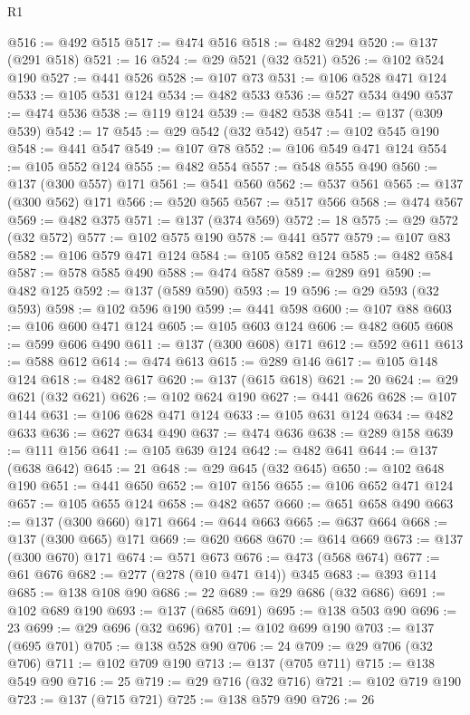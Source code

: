 \begin{lexlean}{R1}
\begin{coremodule}
@516 := @492 @515
@517 := @474 @516
@518 := @482 @294
@520 := @137 (@291 @518)
@521 := 16
@524 := @29 @521 (@32 @521)
@526 := @102 @524 @190
@527 := @441 @526
@528 := @107 @73
@531 := @106 @528 @471 @124
@533 := @105 @531 @124
@534 := @482 @533
@536 := @527 @534 @490
@537 := @474 @536
@538 := @119 @124
@539 := @482 @538
@541 := @137 (@309 @539)
@542 := 17
@545 := @29 @542 (@32 @542)
@547 := @102 @545 @190
@548 := @441 @547
@549 := @107 @78
@552 := @106 @549 @471 @124
@554 := @105 @552 @124
@555 := @482 @554
@557 := @548 @555 @490
@560 := @137 (@300 @557) @171
@561 := @541 @560
@562 := @537 @561
@565 := @137 (@300 @562) @171
@566 := @520 @565
@567 := @517 @566
@568 := @474 @567
@569 := @482 @375
@571 := @137 (@374 @569)
@572 := 18
@575 := @29 @572 (@32 @572)
@577 := @102 @575 @190
@578 := @441 @577
@579 := @107 @83
@582 := @106 @579 @471 @124
@584 := @105 @582 @124
@585 := @482 @584
@587 := @578 @585 @490
@588 := @474 @587
@589 := @289 @91
@590 := @482 @125
@592 := @137 (@589 @590)
@593 := 19
@596 := @29 @593 (@32 @593)
@598 := @102 @596 @190
@599 := @441 @598
@600 := @107 @88
@603 := @106 @600 @471 @124
@605 := @105 @603 @124
@606 := @482 @605
@608 := @599 @606 @490
@611 := @137 (@300 @608) @171
@612 := @592 @611
@613 := @588 @612
@614 := @474 @613
@615 := @289 @146
@617 := @105 @148 @124
@618 := @482 @617
@620 := @137 (@615 @618)
@621 := 20
@624 := @29 @621 (@32 @621)
@626 := @102 @624 @190
@627 := @441 @626
@628 := @107 @144
@631 := @106 @628 @471 @124
@633 := @105 @631 @124
@634 := @482 @633
@636 := @627 @634 @490
@637 := @474 @636
@638 := @289 @158
@639 := @111 @156
@641 := @105 @639 @124
@642 := @482 @641
@644 := @137 (@638 @642)
@645 := 21
@648 := @29 @645 (@32 @645)
@650 := @102 @648 @190
@651 := @441 @650
@652 := @107 @156
@655 := @106 @652 @471 @124
@657 := @105 @655 @124
@658 := @482 @657
@660 := @651 @658 @490
@663 := @137 (@300 @660) @171
@664 := @644 @663
@665 := @637 @664
@668 := @137 (@300 @665) @171
@669 := @620 @668
@670 := @614 @669
@673 := @137 (@300 @670) @171
@674 := @571 @673
@676 := @473 (@568 @674)
@677 := @61 @676
@682 := @277 (@278 (@10 @471 @14)) @345
@683 := @393 @114
@685 := @138 @108 @90
@686 := 22
@689 := @29 @686 (@32 @686)
@691 := @102 @689 @190
@693 := @137 (@685 @691)
@695 := @138 @503 @90
@696 := 23
@699 := @29 @696 (@32 @696)
@701 := @102 @699 @190
@703 := @137 (@695 @701)
@705 := @138 @528 @90
@706 := 24
@709 := @29 @706 (@32 @706)
@711 := @102 @709 @190
@713 := @137 (@705 @711)
@715 := @138 @549 @90
@716 := 25
@719 := @29 @716 (@32 @716)
@721 := @102 @719 @190
@723 := @137 (@715 @721)
@725 := @138 @579 @90
@726 := 26

\end{coremodule}
\end{lexlean}
